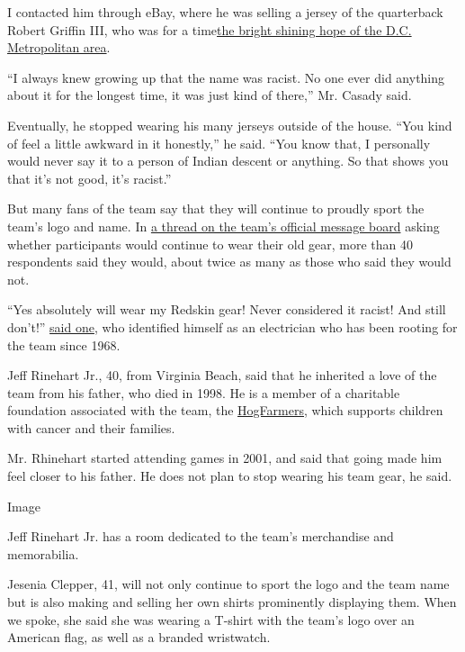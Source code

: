 I contacted him through eBay, where he was selling a jersey of the
quarterback Robert Griffin III, who was for a
time\href{https://www.washingtonpost.com/sports/2020/06/25/rg-iii-his-time-with-redskins-being-an-african-american-quarterback-social-change/}{the
bright shining hope of the D.C. Metropolitan area}.

``I always knew growing up that the name was racist. No one ever did
anything about it for the longest time, it was just kind of there,'' Mr.
Casady said.

Eventually, he stopped wearing his many jerseys outside of the house.
``You kind of feel a little awkward in it honestly,'' he said. ``You
know that, I personally would never say it to a person of Indian descent
or anything. So that shows you that it's not good, it's racist.''

But many fans of the team say that they will continue to proudly sport
the team's logo and name. In
\href{https://es.redskins.com/topic/439661-will-you-still-wear-your-redskins-gear-if-the-name-changes/page/6/}{a
thread on the team's official message board} asking whether participants
would continue to wear their old gear, more than 40 respondents said
they would, about twice as many as those who said they would not.

``Yes absolutely will wear my Redskin gear! Never considered it racist!
And still don't!''
\href{https://es.redskins.com/topic/439661-will-you-still-wear-your-redskins-gear-if-the-name-changes/page/2/?tab=comments\#comment-11804256}{said
one}, who identified himself as an electrician who has been rooting for
the team since 1968.

Jeff Rinehart Jr., 40, from Virginia Beach, said that he inherited a
love of the team from his father, who died in 1998. He is a member of a
charitable foundation associated with the team, the
\href{https://www.hogshaven.com/2020/2/9/21129032/the-hogfarmers-supporting-both-the-redskins-and-kids-with-pediatric-cancer-and-their-families}{HogFarmers,}
which supports children with cancer and their families.

Mr. Rhinehart started attending games in 2001, and said that going made
him feel closer to his father. He does not plan to stop wearing his team
gear, he said.

Image

Jeff Rinehart Jr. has a room dedicated to the team's merchandise and
memorabilia.

Jesenia Clepper, 41, will not only continue to sport the logo and the
team name but is also making and selling her own shirts prominently
displaying them. When we spoke, she said she was wearing a T-shirt with
the team's logo over an American flag, as well as a branded wristwatch.

